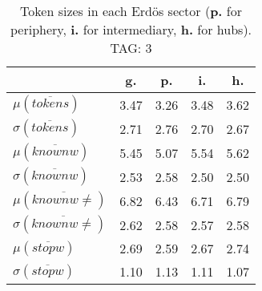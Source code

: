 \begin{table}[h!]
\begin{center}
\begin{tabular}{| l || c | c | c | c |}\hline
 & {\bf g.} & {\bf p.} & {\bf i.} & {\bf h.} \\\hline\hline
$\mu(\overline{tokens})$ & 3.47  & 3.26  & 3.48  & 3.62 \\
$\sigma(\overline{tokens})$ & 2.71  & 2.76  & 2.70  & 2.67 \\\hline
$\mu(\overline{knownw})$ & 5.45  & 5.07  & 5.54  & 5.62 \\
$\sigma(\overline{knownw})$ & 2.53  & 2.58  & 2.50  & 2.50 \\\hline
$\mu(\overline{knownw \neq})$ & 6.82  & 6.43  & 6.71  & 6.79 \\
$\sigma(\overline{knownw \neq})$ & 2.62  & 2.58  & 2.57  & 2.58 \\\hline
$\mu(\overline{stopw})$ & 2.69  & 2.59  & 2.67  & 2.74 \\
$\sigma(\overline{stopw})$ & 1.10  & 1.13  & 1.11  & 1.07 \\\hline
\end{tabular}
\caption{Token sizes in each Erd\"os sector ({{\bf p.}} for periphery, {{\bf i.}} for intermediary, {{\bf h.}} for hubs). TAG: 3}
\end{center}
\end{table}